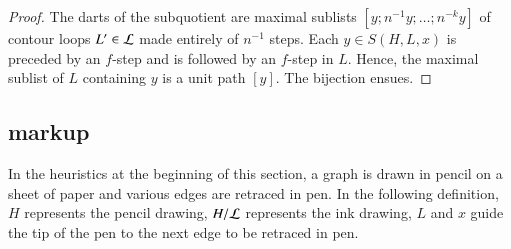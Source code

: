 \begin{proof} The darts of the subquotient are maximal sublists
  $[y;n^{-1} y;\ldots;n^{-k} y]$ of contour loops $L'\in {\cal L}$
  made entirely of $n^{-1}$ steps.  Each $y\in S(H,L,x)$ is preceded
  by an $f$-step and is followed by an $f$-step in $L$.  Hence, the
  maximal sublist of $L$ containing $y$ is a unit path $[y]$.  The
  bijection ensues.
\end{proof}


\subsection{markup}\label{sec:face-insert}
%




In the heuristics at the beginning of this section, a graph is drawn in pencil
on a sheet of paper and various edges are retraced in pen.  In the following
definition, $H$ represents the pencil drawing, $H/{\cal L}$ represents the ink
drawing,  $L$ and $x$ guide the tip of the pen to the next edge to be retraced in pen.


